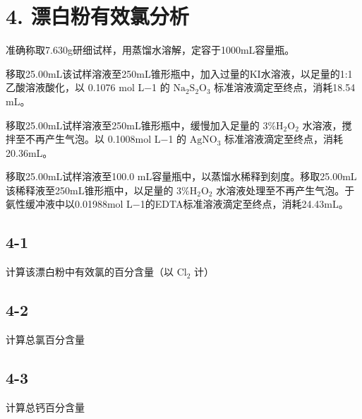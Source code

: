 \section*{4. 漂白粉有效氯分析}
准确称取7.630g研细试样，⽤蒸馏⽔溶解，定容于1000mL容量瓶。

移取25.00mL该试样溶液⾄250mL锥形瓶中，加⼊过量的KI⽔溶液，以⾜量的1:1⼄酸溶液酸化，以 0.1076 mol L−1 的 $\mathrm { N a _ { 2 } S _ { 2 } O _ { 3 } }$ 标准溶液滴定⾄终点，消耗18.54 mL。

移取25.00mL试样溶液⾄250mL锥形瓶中，缓慢加⼊⾜量的 $3 \% \mathrm { H } _ { 2 } \mathrm { O } _ { 2 }$ ⽔溶液，搅拌⾄不再产⽣⽓泡。以 0.1008mol L−1 的 $\mathrm { A g N O _ { 3 } }$ 标准溶液滴定⾄终点，消耗20.36mL。

移取25.00mL试样溶液⾄100.0 mL容量瓶中，以蒸馏⽔稀释到刻度。移取25.00mL该稀释液⾄250mL锥形瓶中，以⾜量的 $3 \% \mathrm { H } _ { 2 } \mathrm { O } _ { 2 }$ ⽔溶液处理⾄不再产⽣⽓泡。于氨性缓冲液中以0.01988mol L−1的EDTA标准溶液滴定⾄终点，消耗24.43mL。

\subsection*{4-1}
计算该漂⽩粉中有效氯的百分含量（以 $\mathrm { C l } _ { 2 }$ 计）

\subsection*{4-2}
计算总氯百分含量

\subsection*{4-3}
计算总钙百分含量
